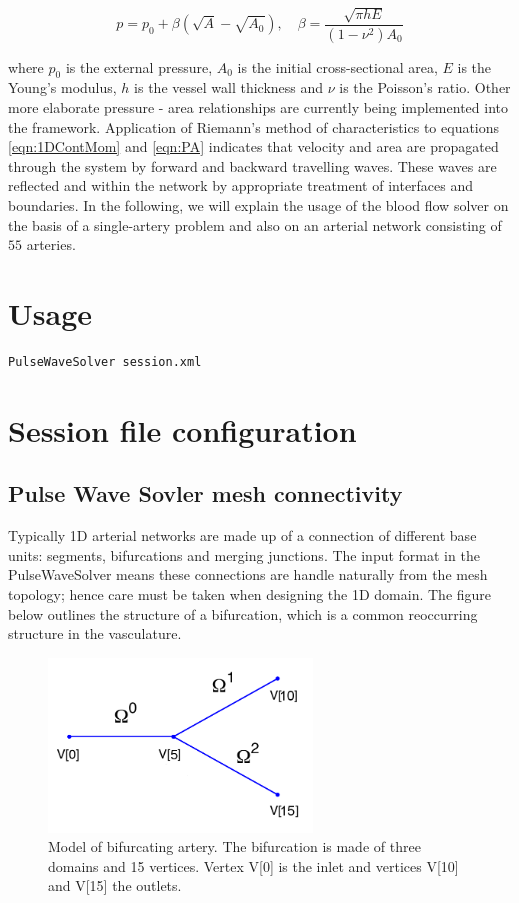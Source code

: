 \begin{equation}
p=p_{0}+\beta\left(\sqrt{A}-\sqrt{A_{0}}\right), \quad \beta=\frac{\sqrt{\pi h E}}{(1-\nu^{2})A_{0}}
\label{eqn:PA}
\end{equation}

where $p_{0}$ is the external pressure, $A_{0}$ is the initial cross-sectional area, $E$ is the Young's modulus, $h$ is the vessel wall thickness and $\nu$ is the Poisson's ratio. Other more elaborate pressure - area relationships are currently being implemented into the framework. Application of Riemann's method of characteristics to equations \ref{eqn:1DContMom} and \ref{eqn:PA} indicates that velocity and area are propagated through the system by forward and backward travelling waves. These waves are reflected and within the network by appropriate treatment of interfaces and boundaries. In the following, we will explain
the usage of the blood flow solver on the basis of a single-artery problem and
also on an arterial network consisting of $55$ arteries.

\section{Usage}
\begin{lstlisting}[style=BashInputStyle]
PulseWaveSolver session.xml
\end{lstlisting}

\section{Session file configuration}

\subsection{Pulse Wave Sovler mesh connectivity}
Typically 1D arterial networks are made up of a connection of different base units: segments, bifurcations and merging junctions. The input format in the PulseWaveSolver means these connections are handle naturally from the mesh topology; hence care must be taken when designing the 1D domain. The figure below outlines the structure of a bifurcation, which is a common reoccurring structure in the vasculature.

\begin{figure}
\begin{center}
\includegraphics[width=7cm]{img/PulseWaveBifurcation.png}
\caption{Model of bifurcating artery. The bifurcation is made of three domains and 15 vertices. Vertex V[0] is the inlet and vertices V[10] and V[15] the outlets.}
\end{center}
\end{figure}

